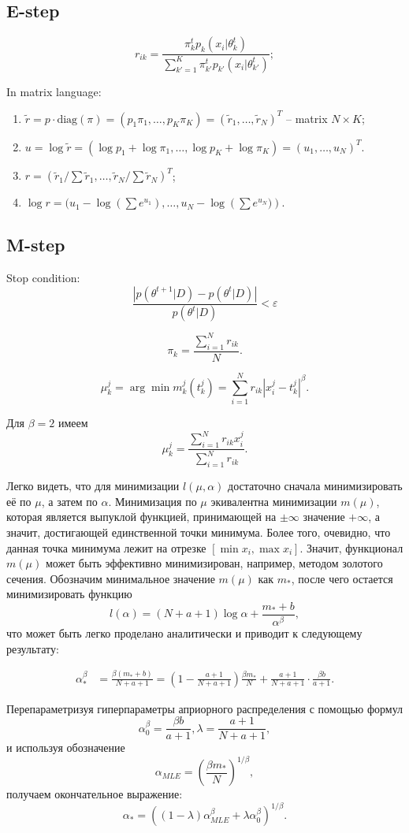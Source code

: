 \documentclass[12pt]{article}
\theoremstyle{definition}
\theoremstyle{plain}
\begin{document}
\subsection{E-step}
$$
r_{ik} = \frac{\pi^t_k p_k(x_i | \theta^t_k)}
{\sum_{k' = 1}^K \pi^t_{k'} p_{k'}(x_i | \theta^t_{k'})};
$$

In matrix language:
\begin{enumerate}
\item $\widetilde{r} = p \cdot \text{diag}(\pi) = (p_1 \pi_1, \ldots, p_K \pi_K) = 
(\widetilde{r}_1, \ldots, \widetilde{r}_N)^T$ --
matrix $N \times K$;
\item $u = \log \widetilde{r} = (\log p_1 + \log \pi_1, \ldots, \log p_K + \log \pi_K) =
(u_1, \ldots, u_N)^T$.
\item $r = (\widetilde{r}_1 / \sum \widetilde{r}_1, \ldots, 
\widetilde{r}_N / \sum \widetilde{r}_N)^T$;
\item $\log r =  (u_1 - \log \left(\sum e^{u_1}\right), \ldots, 
u_N - \log \left(\sum e^{u_N})\right)$.
\end{enumerate}

\subsection{M-step}
Stop condition:
$$
\frac{\left|p(\theta^{t+1} | D) - p(\theta^{t} | D)\right|}{p(\theta^{t} | D)} < \varepsilon
$$

$$
\pi_k = \frac{\sum_{i=1}^N r_{ik}}{N}.
$$


$$
\mu^j_k = \arg \min m_k^j(t_k^j) = \sum_{i = 1}^N r_{ik} |x_i^j - t_k^j|^\beta.
$$

Для $\beta = 2$ имеем
$$
\mu^j_k = \frac{\sum_{i = 1}^N r_{ik} x_i^j}{\sum_{i = 1}^N r_{ik}}.
$$

Легко видеть, что для минимизации $l(\mu, \alpha)$ достаточно сначала минимизировать
её по $\mu$, а затем по $\alpha$. Минимизация по $\mu$ экивалентна минимизации 
$m(\mu)$, которая является выпуклой функцией, принимающей на $\pm \infty$ значение
$+ \infty$, а значит, достигающей единственной точки минимума. Более того, очевидно,
что данная точка минимума лежит на отрезке 
$[\min x_i, \max x_i]$. Значит, функционал $m(\mu)$ может быть эффективно минимизирован,
например, методом золотого сечения. Обозначим минимальное 
значение $m(\mu)$ как $m_*$, после чего остается минимизировать функцию
$$
l(\alpha) = (N + a + 1)\log{\alpha} + \frac{m_* + b}{\alpha^\beta},
$$
что может быть легко проделано аналитически и приводит к следующему результату:

\begin{align*}
\alpha_*^\beta &= \frac{\beta(m_* + b)}{N + a + 1} = 
\left(1 - \frac{a + 1}{N + a + 1} \right) \frac{\beta m_*}{N} +
\frac{a + 1}{N + a + 1} \cdot \frac{\beta b}{a + 1}.
\end{align*}

Перепараметризуя гиперпараметры априорного распределения с помощью формул
$$
\alpha_0^\beta = \frac{\beta b}{a + 1}, \lambda = \frac{a + 1}{N + a + 1},
$$
и используя обозначение
$$\alpha_{MLE} = \left(\frac{\beta m_*}{N}\right)^{1 / \beta},$$
получаем окончательное выражение:
$$
\alpha_* = 
\left((1 - \lambda) \alpha_{MLE}^\beta + \lambda \alpha_0^\beta \right)^{1 / \beta}.
$$
		
		
\end{document}
